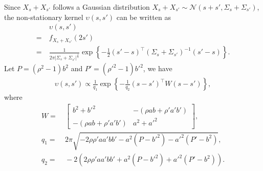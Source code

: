 \documentclass[journal]{IEEEtran}
\begin{document}
Since $X_s + X_{s'}$ follows a Gaussian distribution
$
X_s + X_{s'} \sim \mathcal{N}\left ( s + s', \Sigma_s + \Sigma_{s'} \right )
$,
the non-stationary kernel $\upsilon(s, s')$ can be written as
\begin{align*}
    &~\upsilon(s, s') \\
    =&~f_{X_s+X_{s'}}(2s') \\
    =&~\frac{1}{2\pi | \Sigma_s + \Sigma_{s'} |^{\frac{1}{2}}} \exp\left \{-\frac{1}{2}(s' - s)^\top(\Sigma_s + \Sigma_{s'})^{-1}(s' - s)\right \}.
\end{align*}
Let $P = (\rho^2 - 1) b^2$ and $P' = ({\rho'}^2 - 1) {b'}^2$, we have 
\begin{align*}
    \upsilon(s, s') \propto \frac{1}{q_1} \exp\left\{-\frac{1}{q_2} (s-s')^\top W (s-s')\right\},
\end{align*}
where
\begin{align*}
    W = &~ \begin{bmatrix}
    b^2 + b'^2 & - (\rho a b + \rho' a' b')\\
    - (\rho a b + \rho' a' b') & a^2 + a'^2
    \end{bmatrix},\\
    q_1 = &~ 2 \pi\sqrt{-2\rho \rho' a a' b b' - a^2 (P - b'^2) - a'^2(P' - b^2)},\\
    q_2 = 
    &~ -2(2\rho \rho' a a' b b' + a^2 (P - b'^2) + a'^2(P' - b^2)).
\end{align*}
\end{document}
